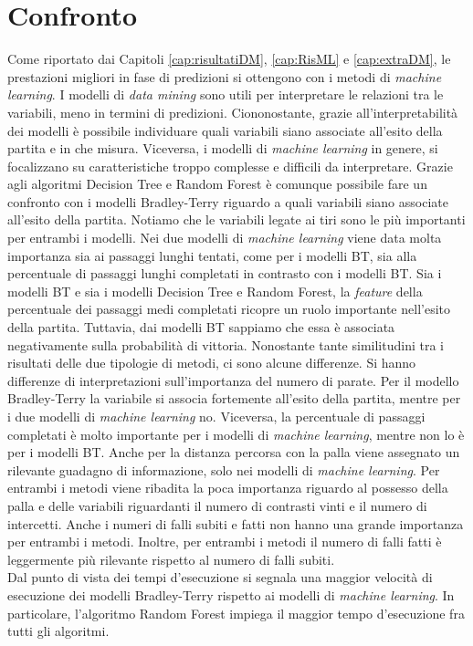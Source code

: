 \section{Confronto}
Come riportato dai Capitoli \ref{cap:risultatiDM}, \ref{cap:RisML} e  \ref{cap:extraDM}, le prestazioni migliori in fase di predizioni si ottengono con i metodi di \emph{machine learning}. I modelli di \emph{data mining} sono utili per interpretare le relazioni tra le variabili, meno in termini di predizioni. Ciononostante, grazie all'interpretabilità dei modelli è possibile individuare quali variabili siano associate all'esito della partita e in che misura. Viceversa, i modelli di \emph{machine learning} in genere, si focalizzano su caratteristiche troppo complesse e difficili da interpretare. Grazie agli algoritmi Decision Tree e Random Forest è comunque possibile fare un confronto con i modelli Bradley-Terry riguardo a quali variabili siano associate all'esito della partita.
Notiamo che le variabili legate ai tiri sono le più importanti per entrambi i modelli. Nei due modelli di \emph{machine learning} viene data molta importanza sia ai passaggi lunghi tentati, come per i modelli BT, sia alla percentuale di passaggi lunghi completati in contrasto con i modelli BT. 
Sia i modelli BT e sia i modelli Decision Tree e Random Forest, la \emph{feature} della percentuale dei passaggi medi completati ricopre un ruolo importante nell'esito della partita. Tuttavia, dai modelli BT sappiamo che essa è associata negativamente sulla probabilità di vittoria.
Nonostante tante similitudini tra i risultati delle due tipologie di metodi, ci sono alcune differenze. Si hanno differenze di interpretazioni sull'importanza del numero di parate. Per il modello Bradley-Terry la variabile si associa fortemente all'esito della partita, mentre per i due modelli di \emph{machine learning} no. Viceversa, la percentuale di passaggi completati è molto importante per i  modelli di \emph{machine learning}, mentre non lo è per i modelli BT. Anche per la distanza percorsa con la palla viene assegnato un rilevante guadagno di informazione, solo nei modelli di \emph{machine learning}. Per entrambi i metodi viene ribadita la poca importanza riguardo al possesso della palla e delle variabili riguardanti il numero di contrasti vinti e il numero di intercetti. Anche i numeri di falli subiti e fatti non hanno una grande importanza per entrambi i metodi. Inoltre, per entrambi i metodi il numero di falli fatti è leggermente più rilevante rispetto al numero di falli subiti.\\
Dal punto di vista dei tempi d'esecuzione si segnala una maggior velocità di esecuzione dei modelli Bradley-Terry rispetto ai modelli di \emph{machine learning}. In particolare, l'algoritmo Random Forest impiega il maggior tempo d'esecuzione fra tutti gli algoritmi.


